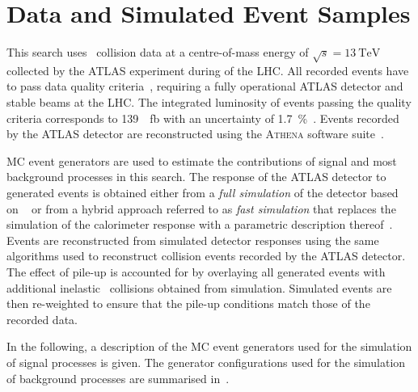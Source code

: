 \section{Data and Simulated Event Samples}%
\label{sec:data_and_simulation}

This search uses \pp~collision data at a centre-of-mass energy of
$\sqrt{s} = \SI{13}{\TeV}$ collected by the ATLAS experiment during \RunTwo of
the LHC. All recorded events have to pass data quality
criteria~\cite{DAPR-2018-01}, requiring a fully operational ATLAS detector and
stable beams at the LHC. The integrated luminosity of events passing the quality
criteria corresponds to \SI{139}{\per\femto\barn} with an uncertainty of
\SI{1.7}{\percent}~\cite{ATLAS-CONF-2019-021}. Events recorded by the ATLAS
detector are reconstructed using the \textsc{Athena} software
suite~\cite{ATL-SOFT-PUB-2021-001}.


MC event generators are used to estimate the contributions of signal and most
background processes in this search. The response of the ATLAS detector to
generated events is obtained either from a \emph{full simulation} of the
detector based on \GEANT~\cite{SOFT-2010-01,Agostinelli:2002hh} or from a hybrid
approach referred to as \emph{fast simulation} that replaces the simulation of
the calorimeter response with a parametric description
thereof~\cite{SOFT-2010-01}. Events are reconstructed from simulated detector
responses using the same algorithms used to reconstruct collision events
recorded by the ATLAS detector. The effect of pile-up is accounted for by
overlaying all generated events with additional inelastic \pp~collisions
obtained from simulation. Simulated events are then re-weighted to ensure that
the pile-up conditions match those of the recorded data.

In the following, a description of the MC event generators used for the
simulation of signal processes is given. The generator configurations used for
the simulation of background processes are summarised in~.

